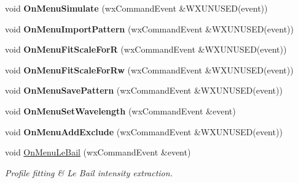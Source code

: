 \begin{DoxyCompactItemize}
void {\bfseries On\+Menu\+Simulate} (wx\+Command\+Event \&W\+X\+U\+N\+U\+S\+ED(event))
\item 
\mbox{\label{class_obj_cryst_1_1_w_x_powder_pattern_ac609ed08d513b5cdc1857049d9f25497}} 
void {\bfseries On\+Menu\+Import\+Pattern} (wx\+Command\+Event \&W\+X\+U\+N\+U\+S\+ED(event))
\item 
\mbox{\label{class_obj_cryst_1_1_w_x_powder_pattern_a66b7e00877826d4e086c350c61304ca6}} 
void {\bfseries On\+Menu\+Fit\+Scale\+ForR} (wx\+Command\+Event \&W\+X\+U\+N\+U\+S\+ED(event))
\item 
\mbox{\label{class_obj_cryst_1_1_w_x_powder_pattern_a0f618a59e11bfe9f9aa57c83177fd88d}} 
void {\bfseries On\+Menu\+Fit\+Scale\+For\+Rw} (wx\+Command\+Event \&W\+X\+U\+N\+U\+S\+ED(event))
\item 
\mbox{\label{class_obj_cryst_1_1_w_x_powder_pattern_ad0a78347d2d45eadaada1ed051b494f4}} 
void {\bfseries On\+Menu\+Save\+Pattern} (wx\+Command\+Event \&W\+X\+U\+N\+U\+S\+ED(event))
\item 
\mbox{\label{class_obj_cryst_1_1_w_x_powder_pattern_a87f543f1c4a281bcfc130e795c2f09ba}} 
void {\bfseries On\+Menu\+Set\+Wavelength} (wx\+Command\+Event \&event)
\item 
\mbox{\label{class_obj_cryst_1_1_w_x_powder_pattern_ade963add8345d6f87c3500861e42a16d}} 
void {\bfseries On\+Menu\+Add\+Exclude} (wx\+Command\+Event \&W\+X\+U\+N\+U\+S\+ED(event))
\item 
\mbox{\label{class_obj_cryst_1_1_w_x_powder_pattern_a1522bb5027652f4362eaee24e8bc2ac5}} 
void \mbox{\hyperlink{class_obj_cryst_1_1_w_x_powder_pattern_a1522bb5027652f4362eaee24e8bc2ac5}{On\+Menu\+Le\+Bail}} (wx\+Command\+Event \&event)
\begin{DoxyCompactList}\small\item\em Profile fitting \& Le Bail intensity extraction. \end{DoxyCompactList}\item 

\end{DoxyCompactItemize}
